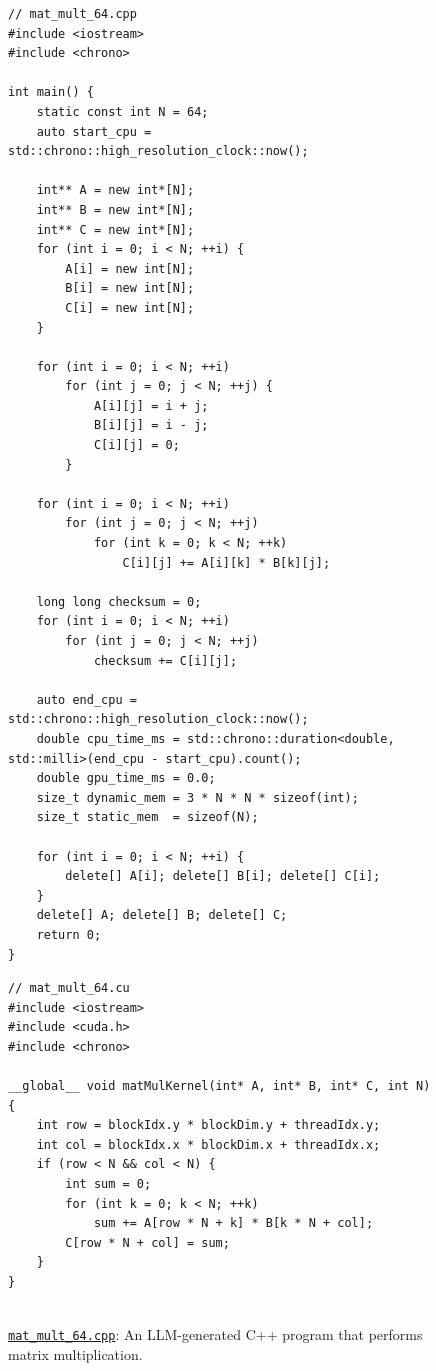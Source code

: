 \documentclass{article}
\begin{document}
\begin{figure}[H]
\noindent%
\begin{minipage}[t]{0.49\textwidth}
\begin{verbatim}
// mat_mult_64.cpp
#include <iostream>
#include <chrono>

int main() {
    static const int N = 64;
    auto start_cpu = std::chrono::high_resolution_clock::now();

    int** A = new int*[N];
    int** B = new int*[N];
    int** C = new int*[N];
    for (int i = 0; i < N; ++i) {
        A[i] = new int[N];
        B[i] = new int[N];
        C[i] = new int[N];
    }

    for (int i = 0; i < N; ++i)
        for (int j = 0; j < N; ++j) {
            A[i][j] = i + j;
            B[i][j] = i - j;
            C[i][j] = 0;
        }

    for (int i = 0; i < N; ++i)
        for (int j = 0; j < N; ++j)
            for (int k = 0; k < N; ++k)
                C[i][j] += A[i][k] * B[k][j];

    long long checksum = 0;
    for (int i = 0; i < N; ++i)
        for (int j = 0; j < N; ++j)
            checksum += C[i][j];

    auto end_cpu = std::chrono::high_resolution_clock::now();
    double cpu_time_ms = std::chrono::duration<double, std::milli>(end_cpu - start_cpu).count();
    double gpu_time_ms = 0.0;
    size_t dynamic_mem = 3 * N * N * sizeof(int);
    size_t static_mem  = sizeof(N);

    for (int i = 0; i < N; ++i) {
        delete[] A[i]; delete[] B[i]; delete[] C[i];
    }
    delete[] A; delete[] B; delete[] C;
    return 0;
}
\end{verbatim}
    \caption{\href{https://github.com/mocha-macchiato-compiler/macchiato/blob/main/benchmarks/mat_mult/cpp/mat_mult_64.cpp}{\texttt{mat\_mult\_64.cpp}}: An LLM-generated C++ program that performs matrix multiplication.}
    \label{fig:mat_mult_64_cpp}
\end{minipage}%
\hfill%
\begin{minipage}[t]{0.49\textwidth}
\begin{verbatim}
// mat_mult_64.cu
#include <iostream>
#include <cuda.h>
#include <chrono>

__global__ void matMulKernel(int* A, int* B, int* C, int N) {
    int row = blockIdx.y * blockDim.y + threadIdx.y;
    int col = blockIdx.x * blockDim.x + threadIdx.x;
    if (row < N && col < N) {
        int sum = 0;
        for (int k = 0; k < N; ++k)
            sum += A[row * N + k] * B[k * N + col];
        C[row * N + col] = sum;
    }
}


\end{verbatim}
\end{minipage}
\end{figure}
\end{document}
